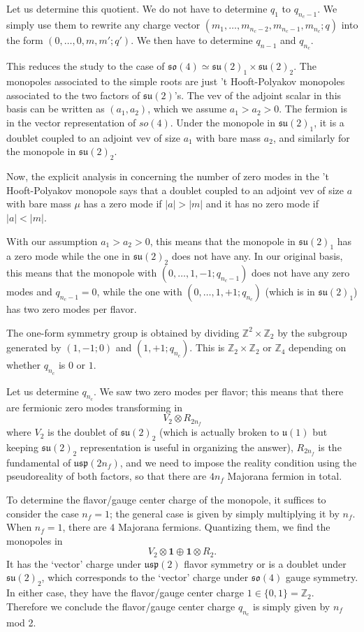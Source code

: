 \documentclass[12pt]{article}
\numberwithin{equation}{section}
\def\bZ{\mathbb{Z}}
\def\u{\mathfrak{u}}
\def\su{\mathfrak{su}}
\def\so{\mathfrak{so}}
\def\usp{\mathfrak{usp}}
\begin{document}
Let us determine this quotient.
We do not have to determine $q_1$ to $q_{n_c-1}$. 
We simply use them to rewrite any charge vector $
(m_1,\ldots, m_{n_c-2}, m_{n_c-1},m_{n_c}; q)
$
into the form $
(0,\ldots,0, m, m' ; q').
$
We then have to determine $q_{n-1}$ and $q_{n_c}$.

This reduces the study to the case of $\so(4)\simeq \su(2)_1 \times \su(2)_2$.
The monopoles associated to the simple roots are just 't Hooft-Polyakov monopoles associated to the two factors of $\su(2)$'s.
The vev of the adjoint scalar in this basis can be written as $(a_1,a_2)$, which we assume $a_1>a_2>0$.
The fermion is in the vector representation of $so(4)$.
Under the monopole in $\su(2)_1$, it is a doublet coupled to an adjoint vev of size $a_1$ with bare mass $a_2$,
and similarly for the monopole in $\su(2)_2$.

Now, the explicit analysis in \cite[Sec.~IV]{Callias:1977kg} concerning the number of zero modes in the 't Hooft-Polyakov monopole says that 
a doublet coupled to an adjoint vev of size $a$ with bare mass $\mu$ has
 a zero mode if $|a|>|m|$ and 
 it has no zero mode if $|a|<|m|$.
 
With our assumption $a_1>a_2>0$, this means that the monopole in $\su(2)_1$ has a zero mode while the one in $\su(2)_2$ does not have any.
In our original basis, this means that the monopole with $(0,\ldots,1,-1;q_{n_c-1})$ does not have any zero modes and $q_{n_c-1}=0$,
while the one with $(0,\ldots,1,+1;q_{n_c})$  (which is in $\su(2)_1$) has two zero modes per flavor.

The one-form symmetry group is obtained by dividing $\bZ^2\times \bZ_2$ by the subgroup generated by $(1,-1;0)$ and $(1,+1;q_{n_c})$.
This is $\bZ_2\times \bZ_2$ or $\bZ_4$ depending on whether $q_{n_c}$ is $0$ or $1$.

Let us determine $q_{n_c}$.
We saw two zero modes per flavor; 
this means that there are fermionic zero modes transforming in \begin{equation}
V_{2} \otimes R_{2n_f} 
\end{equation} where $V_2$ is the doublet of $\su(2)_2$ (which is actually broken to $\u(1)$ but keeping $\su(2)_2$ representation is useful in organizing the answer), 
$R_{2n_f}$ is the fundamental of $\usp(2n_f)$,
and we need to impose the reality condition using the pseudoreality of both factors,
so that there are $4n_f$ Majorana fermion in total.

To determine the flavor/gauge center charge of the monopole,
it suffices to consider the case $n_f=1$;
the general case is given by simply multiplying it by $n_f$.
When $n_f=1$, there are $4$ Majorana fermions.
Quantizing them, we find the monopoles in \begin{equation}
V_2 \otimes \mathbf{1} \oplus \mathbf{1}\otimes R_2.
\end{equation}
It has the `vector' charge under $\usp(2)$ flavor symmetry or is a doublet under $\su(2)_2$,
which corresponds to the `vector' charge under $\so(4)$ gauge symmetry.
In either case, they have the flavor/gauge center charge $1 \in \{0,1\}=\bZ_2$.
Therefore we conclude the flavor/gauge center charge $q_{n_c}$ is simply given by $n_f$ mod 2.
\end{document}
